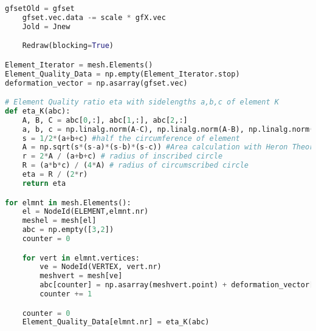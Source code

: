 \begin{appendix}
\begin{lstlisting}[language=Python, title=NGSolve Shape Optimization Code in Python, label=final_code]
    gfsetOld = gfset
    gfset.vec.data -= scale * gfX.vec
    Jold = Jnew

    Redraw(blocking=True)

Element_Iterator = mesh.Elements()
Element_Quality_Data = np.empty(Element_Iterator.stop)
deformation_vector = np.asarray(gfset.vec)

# Element Quality ratio eta with sidelengths a,b,c of element K
def eta_K(abc):
    A, B, C = abc[0,:], abc[1,:], abc[2,:]
    a, b, c = np.linalg.norm(A-C), np.linalg.norm(A-B), np.linalg.norm(B-C)
    s = 1/2*(a+b+c) #half the circumference of element
    A = np.sqrt(s*(s-a)*(s-b)*(s-c)) #Area calculation with Heron Theorem
    r = 2*A / (a+b+c) # radius of inscribed circle
    R = (a*b*c) / (4*A) # radius of circumscribed circle
    eta = R / (2*r) 
    return eta

for elmnt in mesh.Elements():
    el = NodeId(ELEMENT,elmnt.nr)
    meshel = mesh[el]
    abc = np.empty([3,2])
    counter = 0

    for vert in elmnt.vertices:
        ve = NodeId(VERTEX, vert.nr)
        meshvert = mesh[ve]
        abc[counter] = np.asarray(meshvert.point) + deformation_vector[vert.nr]
        counter += 1

    counter = 0
    Element_Quality_Data[elmnt.nr] = eta_K(abc)
\end{lstlisting}

\vfill

\end{appendix}
